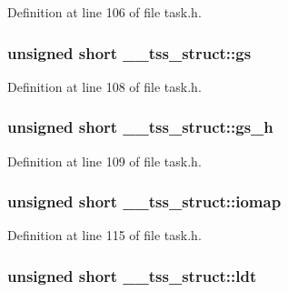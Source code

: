Definition at line 106 of file task.\+h.

\subsubsection[{\texorpdfstring{gs}{gs}}]{\setlength{\rightskip}{0pt plus 5cm}unsigned short \+\_\+\+\_\+tss\+\_\+struct\+::gs}\hypertarget{struct____tss__struct_ad99e75893aedb89cd0e136e3e6e57727}{}\label{struct____tss__struct_ad99e75893aedb89cd0e136e3e6e57727}


Definition at line 108 of file task.\+h.

\subsubsection[{\texorpdfstring{gs\+\_\+h}{gs_h}}]{\setlength{\rightskip}{0pt plus 5cm}unsigned short \+\_\+\+\_\+tss\+\_\+struct\+::gs\+\_\+h}\hypertarget{struct____tss__struct_a724b8bddadd1b77d08b16d4292f3ac77}{}\label{struct____tss__struct_a724b8bddadd1b77d08b16d4292f3ac77}


Definition at line 109 of file task.\+h.

\subsubsection[{\texorpdfstring{iomap}{iomap}}]{\setlength{\rightskip}{0pt plus 5cm}unsigned short \+\_\+\+\_\+tss\+\_\+struct\+::iomap}\hypertarget{struct____tss__struct_a2ee32c201d129f8ee19dfd510b5d69fd}{}\label{struct____tss__struct_a2ee32c201d129f8ee19dfd510b5d69fd}


Definition at line 115 of file task.\+h.

\subsubsection[{\texorpdfstring{ldt}{ldt}}]{\setlength{\rightskip}{0pt plus 5cm}unsigned short \+\_\+\+\_\+tss\+\_\+struct\+::ldt}\hypertarget{struct____tss__struct_a16d41b1184cf4d1a2af29cd288635c78}{}\label{struct____tss__struct_a16d41b1184cf4d1a2af29cd288635c78}


